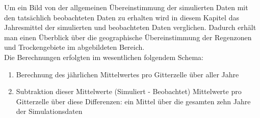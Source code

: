 Um ein Bild von der allgemeinen Übereinstimmung der simulierten Daten mit den tatsächlich beobachteten Daten zu erhalten wird in diesem Kapitel das Jahresmittel der simulierten und beobachteten Daten verglichen. Dadurch erhält man einen Überblick über die geographische Übereinstimmung der Regenzonen und Trockengebiete im abgebildeten Bereich.\\
Die Berechnungen erfolgten im wesentlichen folgendem Schema:
\begin{enumerate}
	\item Berechnung des jährlichen Mittelwertes pro Gitterzelle über aller Jahre
	\item Subtraktion dieser Mittelwerte (Simuliert - Beobachtet)
	\subitem Mittelwerte pro Gitterzelle über diese Differenzen: ein Mittel über die gesamten zehn Jahre der Simulationsdaten	
\end{enumerate}

